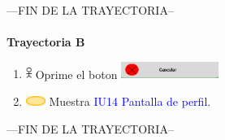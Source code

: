 ---FIN DE LA TRAYECTORIA--\\\\
\textbf{Trayectoria B}
    \begin{enumerate}
        \item \includegraphics[width=0.0150\textwidth]{Figuras/persona.png} Oprime el boton \includegraphics[width=0.25\textwidth]{ComponentesCU/img3.png}
        \item \includegraphics[width=0.0500\textwidth]{Figuras/sistema.png} Muestra \textcolor{blue}{IU14 Pantalla de perfil}.
    \end{enumerate}
---FIN DE LA TRAYECTORIA--
\newpage

